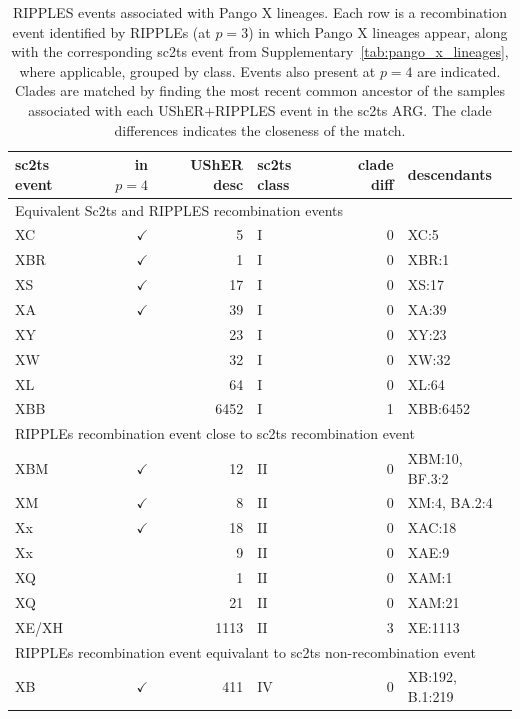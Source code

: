 \documentclass[12pt]{article}
\newcommand{\siref}[1]{Supplementary~\ref{#1}}
\begin{document}
\begin{table}
\caption{
RIPPLES events associated with Pango X lineages.
Each row is a recombination event identified by RIPPLEs (at $p=3$)
in which Pango X lineages appear,
along with the corresponding sc2ts event from \siref{tab:pango_x_lineages},
where applicable, grouped by class.
Events also present at $p=4$ are indicated.
Clades are matched by finding the most recent common ancestor of
the samples associated with each UShER+RIPPLES event in the sc2ts ARG.
The clade differences indicates the closeness of the match.
}
\label{tab:ripples_x_lineages}
\centering
\begin{scriptsize}

\begin{tabular}{lrrlrl}
\toprule
sc2ts event & in $p=4$ & UShER desc & sc2ts class & clade diff & descendants \\
\midrule
\multicolumn{6}{l}{Equivalent Sc2ts and RIPPLES recombination events}\\
XC & $\checkmark$ & 5 & I & 0 & {XC:5} \\
XBR & $\checkmark$ & 1 & I & 0 & {XBR:1} \\
XS & $\checkmark$ & 17 & I & 0 & {XS:17} \\
XA & $\checkmark$ & 39 & I & 0 & {XA:39} \\
XY &  & 23 & I & 0 & {XY:23} \\
XW &  & 32 & I & 0 & {XW:32} \\
XL &  & 64 & I & 0 & {XL:64} \\
XBB &  & 6452 & I & 1 & {XBB:6452} \\
\midrule
\multicolumn{6}{l}{RIPPLEs recombination event close to sc2ts recombination event}\\
XBM & $\checkmark$ & 12 & II & 0 & {XBM:10, BF.3:2} \\
XM & $\checkmark$ & 8 & II & 0 & {XM:4, BA.2:4} \\
Xx & $\checkmark$ & 18 & II & 0 & {XAC:18} \\
Xx &  & 9 & II & 0 & {XAE:9} \\
XQ &  & 1 & II & 0 & {XAM:1} \\
XQ &  & 21 & II & 0 & {XAM:21} \\
XE/XH &  & 1113 & II & 3 & {XE:1113} \\
\midrule
\multicolumn{6}{l}{RIPPLEs recombination event equivalant to sc2ts non-recombination event}\\
XB & $\checkmark$ & 411 & IV & 0 & {XB:192, B.1:219} \\

\end{tabular}
\end{scriptsize}
\end{table}
\end{document}
